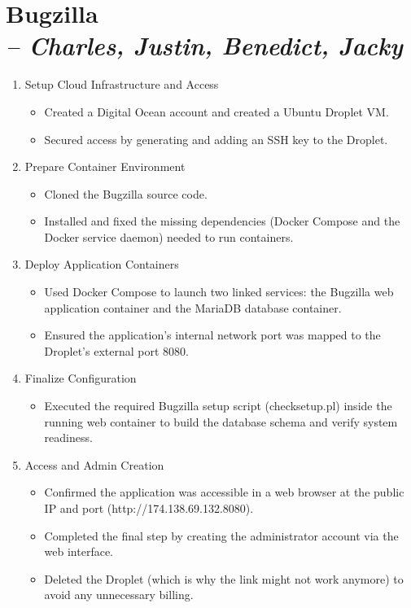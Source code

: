 \chapter[Bugzilla]{Bugzilla \\\small{\textit{-- Charles, Justin, Benedict, Jacky}}}
\label{Chapter::Bugzilla}

\begin{enumerate}
    \item Setup Cloud Infrastructure and Access
    \begin{itemize}
        \item Created a Digital Ocean account and created a Ubuntu Droplet VM.
        \item Secured access by generating and adding an SSH key to the Droplet.
    \end{itemize}
    
    \item Prepare Container Environment
    \begin{itemize}
        \item Cloned the Bugzilla source code.
        \item Installed and fixed the missing dependencies (Docker Compose and the Docker service daemon) needed to run containers.
    \end{itemize}
    
    \item Deploy Application Containers
    \begin{itemize}
        \item Used Docker Compose to launch two linked services: the Bugzilla web application container and the MariaDB database container.
        \item Ensured the application's internal network port was mapped to the Droplet's external port 8080.
    \end{itemize}
    
    \item Finalize Configuration
    \begin{itemize}
        \item Executed the required Bugzilla setup script (checksetup.pl) inside the running web container to build the database schema and verify system readiness.
    \end{itemize}
    
    \item Access and Admin Creation
    \begin{itemize}
        \item Confirmed the application was accessible in a web browser at the public IP and port (http://174.138.69.132.8080).
        \item Completed the final step by creating the administrator account via the web interface.
        \item Deleted the Droplet (which is why the link might not work anymore) to avoid any unnecessary billing.
    \end{itemize}
    
\end{enumerate}

